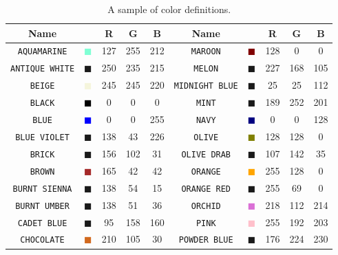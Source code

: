 \documentclass[11pt]{book}
\newcommand{\ct}{\tt\small}
\begin{document}
\begin{table}[p]
\begin{center}
\caption[A sample of color definitions]{A sample of color definitions.}
\label{tab:colors}
\vspace{0.1in}
\begin{tabular}{|c|c|c|c|c|c||c|c|c|c|}
\hline
Name & &  R  & G & B & Name & & R & G & B   \\ \hline \hline
{\ct AQUAMARINE} & \textcolor{AQUAMARINE} {$\blacksquare$} & 127& 255& 212& {\ct MAROON} &  \textcolor{MAROON} {$\blacksquare$} & 128& 0& 0  \\ \hline
{\ct ANTIQUE WHITE} & \textcolor{ANTIQUE WHITE} {$\blacksquare$} & 250& 235& 215& {\ct MELON} &  \textcolor{MELON} {$\blacksquare$} & 227& 168& 105  \\ \hline
{\ct BEIGE} & \textcolor{BEIGE} {$\blacksquare$} & 245& 245& 220& {\ct MIDNIGHT BLUE} &  \textcolor{MIDNIGHT BLUE} {$\blacksquare$} & 25& 25& 112  \\ \hline
{\ct BLACK} & \textcolor{BLACK} {$\blacksquare$} & 0& 0& 0& {\ct MINT} &  \textcolor{MINT} {$\blacksquare$} & 189& 252& 201  \\ \hline
{\ct BLUE} & \textcolor{BLUE} {$\blacksquare$} & 0& 0& 255& {\ct NAVY} &  \textcolor{NAVY} {$\blacksquare$} & 0& 0& 128  \\ \hline
{\ct BLUE VIOLET} & \textcolor{BLUE VIOLET} {$\blacksquare$} & 138& 43& 226& {\ct OLIVE} &  \textcolor{OLIVE} {$\blacksquare$} & 128& 128& 0  \\ \hline
{\ct BRICK} & \textcolor{BRICK} {$\blacksquare$} & 156& 102& 31& {\ct OLIVE DRAB} &  \textcolor{OLIVE DRAB} {$\blacksquare$} & 107& 142& 35  \\ \hline
{\ct BROWN} & \textcolor{BROWN} {$\blacksquare$} & 165& 42& 42& {\ct ORANGE} &  \textcolor{ORANGE} {$\blacksquare$} & 255& 128& 0  \\ \hline
{\ct BURNT SIENNA} & \textcolor{BURNT SIENNA} {$\blacksquare$} & 138& 54& 15& {\ct ORANGE RED} &  \textcolor{ORANGE RED} {$\blacksquare$} & 255& 69& 0  \\ \hline
{\ct BURNT UMBER} & \textcolor{BURNT UMBER} {$\blacksquare$} & 138& 51& 36& {\ct ORCHID} &  \textcolor{ORCHID} {$\blacksquare$} & 218& 112& 214  \\ \hline
{\ct CADET BLUE} & \textcolor{CADET BLUE} {$\blacksquare$} & 95& 158& 160& {\ct PINK} &  \textcolor{PINK} {$\blacksquare$} & 255& 192& 203  \\ \hline
{\ct CHOCOLATE} & \textcolor{CHOCOLATE} {$\blacksquare$} & 210& 105& 30& {\ct POWDER BLUE} &  \textcolor{POWDER BLUE} {$\blacksquare$} & 176& 224& 230  \\ \hline

\end{tabular}
\end{center}
\end{table}
\end{document}
